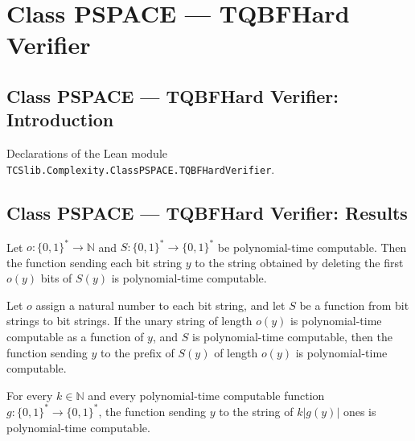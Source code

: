 \section{Class PSPACE --- TQBFHard Verifier}
\subsection*{Class PSPACE --- TQBFHard Verifier: Introduction}

Declarations of the Lean module \texttt{TCSlib.Complexity.ClassPSPACE.TQBFHardVerifier}.

\subsection*{Class PSPACE --- TQBFHard Verifier: Results}

\begin{theorem}
\label{Complexity.TQBFHard.pt_drop}
\leanok
{}
Let $o\colon\{0,1\}^*\to\mathbb N$ and $S\colon\{0,1\}^*\to\{0,1\}^*$ be polynomial-time
computable. Then the function sending each bit string $y$ to the string obtained by
deleting the first $o(y)$ bits of $S(y)$ is polynomial-time computable.
\end{theorem}

\begin{theorem}
\label{Complexity.TQBFHard.pt_take}
\leanok
{}
Let $o$ assign a natural number to each bit string, and let $S$ be a function from bit
strings to bit strings. If the unary string of length $o(y)$ is polynomial-time
computable as a function of $y$, and $S$ is polynomial-time computable, then the
function sending $y$ to the prefix of $S(y)$ of length $o(y)$ is polynomial-time
computable.
\end{theorem}

\begin{theorem}
\label{Complexity.TQBFHard.pt_rep_mul}
\leanok
{}
For every $k\in\mathbb N$ and every polynomial-time computable function
$g\colon\{0,1\}^*\to\{0,1\}^*$, the function sending $y$ to the string of $k|g(y)|$ ones
is polynomial-time computable.
\end{theorem}

